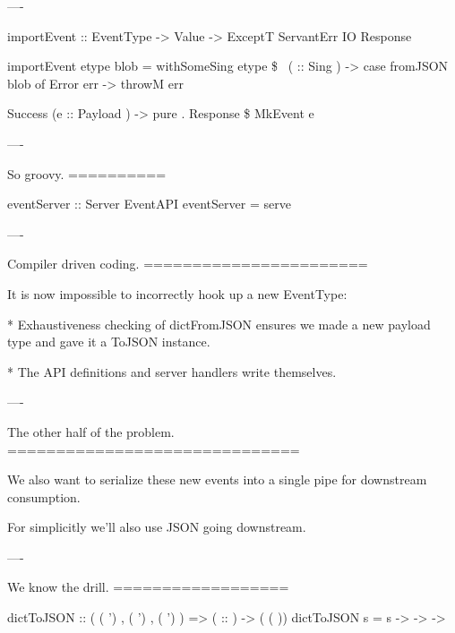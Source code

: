 ----

\begin{raw}
  importEvent :: EventType
              -> Value
              -> ExceptT ServantErr IO Response

  importEvent etype blob =
    withSomeSing etype \$ \ ( :: Sing ) ->
          case fromJSON blob of
            Error err ->
              throwM err

            Success (e :: Payload ) ->
              pure . Response \$ MkEvent e
\end{raw}

----

So groovy.
==========

\begin{raw}
  eventServer :: Server EventAPI
  eventServer = serve 
\end{raw}

----

Compiler driven coding.
=======================

It is now impossible to incorrectly hook up a new EventType:

* Exhaustiveness checking of dictFromJSON ensures we made a new payload type and gave it a ToJSON instance.

* The API definitions and server handlers write themselves.

----

The other half of the problem.
==============================

We also want to serialize these new events into a single pipe for downstream consumption.

For simplicitly we'll also use JSON going downstream.

----

We know the drill.
==================

\begin{custom}
  dictToJSON :: (  ( ')
                ,  ( ')
                ,  ( ')
                )
             =>  ( :: )
             ->  ( ( ))
  dictToJSON s =  s 
      -> 
         -> 
     -> 
\end{custom}

